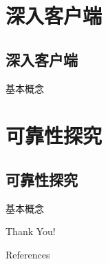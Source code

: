 \section{深入客户端}
\subsection{深入客户端}
\begin{frame}[plain,t]{基本概念} %
	 \\  \vspace{2ex}
	
\end{frame}

\section{可靠性探究}
\subsection{可靠性探究}
\begin{frame}[plain,t]{基本概念} %
	 \\  \vspace{2ex}
	
\end{frame}





\begin{frame}[plain]
	\huge
	\vfill
	\centerline{  }
	\vfill
	
\end{frame}
\begin{frame}[plain]
	\huge
	\vfill
	\centerline{  }
	\vfill
	\Huge
	\centerline{\alert{Thank You!} }
	\vfill
\end{frame}

\begin{frame}{References}
\end{frame}  
 
